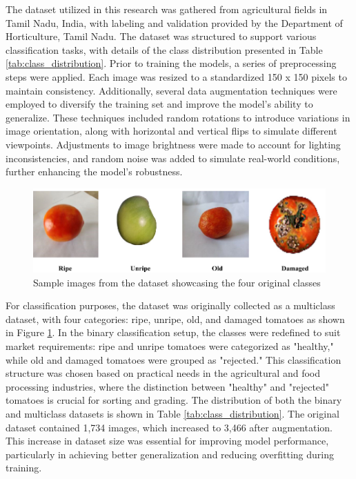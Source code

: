 \documentclass[12pt,a4paper]{report}
\begin{document}
\hspace{1cm}The dataset utilized in this research was gathered from agricultural fields in Tamil Nadu, India, with labeling and validation provided by the Department of Horticulture, Tamil Nadu. The dataset was structured to support various classification tasks, with details of the class distribution presented in Table \ref{tab:class_distribution}. Prior to training the models, a series of preprocessing steps were applied. Each image was resized to a standardized 150 x 150 pixels to maintain consistency. Additionally, several data augmentation techniques were employed to diversify the training set and improve the model’s ability to generalize. These techniques included random rotations to introduce variations in image orientation, along with horizontal and vertical flips to simulate different viewpoints. Adjustments to image brightness were made to account for lighting inconsistencies, and random noise was added to simulate real-world conditions, further enhancing the model’s robustness.

\begin{figure}[htbp]\renewcommand\thefigure{3.2} \centering \includegraphics[width=1\textwidth]{DOC/dataset.png} \caption{Sample images from the dataset showcasing the four original classes} \label{fig:dataset} \end{figure}

For classification purposes, the dataset was originally collected as a multiclass dataset, with four categories: ripe, unripe, old, and damaged tomatoes as shown in Figure \ref{fig:dataset}. In the binary classification setup, the classes were redefined to suit market requirements: ripe and unripe tomatoes were categorized as "healthy," while old and damaged tomatoes were grouped as "rejected." This classification structure was chosen based on practical needs in the agricultural and food processing industries, where the distinction between "healthy" and "rejected" tomatoes is crucial for sorting and grading. The distribution of both the binary and multiclass datasets is shown in Table \ref{tab:class_distribution}. The original dataset contained 1,734 images, which increased to 3,466 after augmentation. This increase in dataset size was essential for improving model performance, particularly in achieving better generalization and reducing overfitting during training.
 
\end{document}
